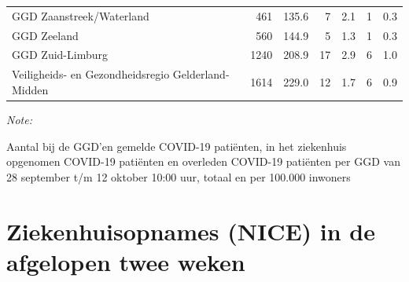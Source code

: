 \documentclass[
  english,
  man,floatsintext]{apa6}
\begin{document}
\begin{table}
\begin{threeparttable}
\begin{tabular}{lrrrrrr}
GGD Zaanstreek/Waterland & 461 & 135.6 & 7 & 2.1 & 1 & 0.3\\
GGD Zeeland & 560 & 144.9 & 5 & 1.3 & 1 & 0.3\\
GGD Zuid-Limburg & 1240 & 208.9 & 17 & 2.9 & 6 & 1.0\\
Veiligheids- en Gezondheidsregio Gelderland-Midden & 1614 & 229.0 & 12 & 1.7 & 6 & 0.9\\
\bottomrule
\end{tabular}
\begin{tablenotes}
\item \textit{Note: } 
\item Aantal bij de GGD’en gemelde COVID-19 patiënten, in het ziekenhuis opgenomen COVID-19 patiënten en overleden COVID-19 patiënten per GGD van 28 september t/m 12 oktober 10:00 uur, totaal en per 100.000 inwoners
\end{tablenotes}
\end{threeparttable}
\endgroup{}
\end{table}

\newpage

\hypertarget{ziekenhuisopnames-nice-in-de-afgelopen-twee-weken}{%
\section{Ziekenhuisopnames (NICE) in de afgelopen twee weken}\label{ziekenhuisopnames-nice-in-de-afgelopen-twee-weken}}
\end{document}
